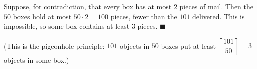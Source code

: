 Suppose, for contradiction, that every box has at most $2$ pieces of mail. Then the $50$ boxes hold at most $50\cdot2=100$ pieces, fewer than the $101$ delivered. This is impossible, so some box contains at least $3$ pieces. $\blacksquare$

(This is the pigeonhole principle: $101$ objects in $50$ boxes put at least $\left\lceil\dfrac{101}{50}\right\rceil=3$ objects in some box.)
